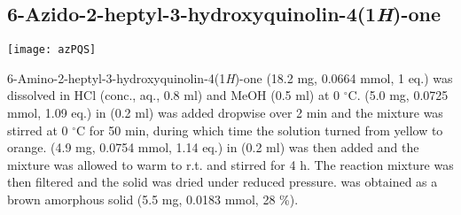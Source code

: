 {{{{{{{{{{{{{{{\subsection{6-Azido-2-heptyl-3-hydroxyquinolin-4(1\textit{H})-one }




\begin{scheme}[H]
	\begin{center}
		\texttt{[image: azPQS]}
	\end{center}
\end{scheme}

6-Amino-2-heptyl-3-hydroxyquinolin-4(1\textit{H})-one  (18.2 mg, 0.0664 mmol, 1 eq.) was dissolved in HCl (conc., aq., 0.8 ml) and MeOH (0.5 ml) at 0 $^{\circ}$C.  (5.0 mg, 0.0725 mmol, 1.09 eq.) in  (0.2 ml) was added dropwise over 2 min and the mixture was stirred at 0 $^{\circ}$C for 50 min, during which time the solution turned from yellow to orange.  (4.9 mg, 0.0754 mmol, 1.14 eq.) in  (0.2 ml) was then added and the mixture was allowed to warm to r.t. and stirred for 4 h. The reaction mixture was then filtered and the solid was dried under reduced pressure.  was obtained as a brown amorphous solid (5.5 mg, 0.0183 mmol, 28 \%).
\\[1\baselineskip]
\\[1\baselineskip]
\\[1\baselineskip]
\\[1\baselineskip]
}}}}}}}}}}}}}}}
